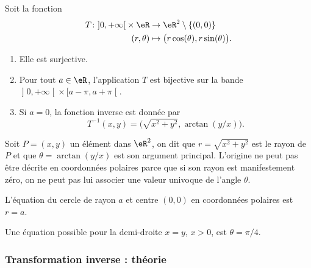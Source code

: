 \begin{proposition}     \label{PROPooFLUAooDsyMXO}
	Soit la fonction
	\begin{equation}
		\begin{aligned}
			T\colon \mathopen] 0 , +\infty \mathclose[\times \eR & \to \eR^2\setminus\{(0,0)\}                      \\
			(r,\theta)                                           & \mapsto \big( r\cos(\theta),r\sin(\theta) \big).
		\end{aligned}
	\end{equation}
	\begin{enumerate}
		\item
		      Elle est surjective.
		\item
		      Pour tout \( a\in \eR\), l'application \( T\) est bijective sur la bande \( \mathopen] 0 , +\infty \mathclose[\times \mathopen[ a-\pi , a+\pi \mathclose[\).
		\item
		      Si \( a=0\), la fonction inverse est donnée par
		      \begin{equation}
			      T^{-1}(x,y)=\big( \sqrt{ x^2+y^2 },\arctan(y/x) \big).
		      \end{equation}
	\end{enumerate}
\end{proposition}

Soit \( P=(x,y)\) un élément dans \( \eR^2\), on dit que \( r=\sqrt{x^2+y^2}\) est le rayon de \( P\) et que \( \theta=\arctan (y/x) \) est son argument principal. L'origine ne peut pas être décrite en coordonnées polaires parce que si son rayon est manifestement zéro, on ne peut pas lui associer une valeur univoque de l'angle \( \theta\).

\begin{example}
	L'équation du cercle de rayon \( a\) et centre \( (0, 0)\) en coordonnées polaires est \( r=a\).
\end{example}

\begin{example}
	Une équation possible pour la demi-droite \( x=y\), \( x>0\),  est \( \theta=\pi/4\).
\end{example}
\subsubsection{Transformation inverse : théorie}

